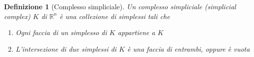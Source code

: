 \documentclass[a4paper]{report}
\newtheorem{definition}{Definizione}
\newcommand{\R}{\ensuremath{\mathbb{R}}}
\begin{document}
\begin{center}

\end{center}
\begin{definition}[Complesso simpliciale]
    Un complesso simpliciale (simplicial complex) $K$ di $\R^n$ è una collezione di simplessi tali che
    \begin{enumerate}
        \item Ogni faccia di un simplesso di $K$ appartiene a $K$
        \item L'intersezione di due simplessi di $K$ è una faccia di entrambi, oppure è vuota
    \end{enumerate}
\end{definition}
\end{document}
